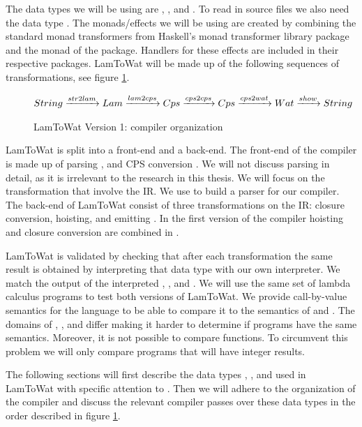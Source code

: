 The data types we will be using are , , and . To read in source files we also need the data type . The monads/effects we will be using are created by combining the standard monad transformers from Haskell's monad transformer library package  and the  monad of the  package. Handlers for these effects are included in their respective packages. LamToWat will be made up of the following sequences of transformations, see figure \ref{fig:lam2watv1org}.

\begin{figure}
\begin{gather*}
  String \xrightarrow{str2lam} Lam \xrightarrow{lam2cps} Cps \xrightarrow{cps2cps} Cps \xrightarrow{cps2wat} Wat \xrightarrow{show} String
\end{gather*}
\caption{LamToWat Version 1: compiler organization}
\label{fig:lam2watv1org}
\end{figure}

LamToWat is split into a front-end and a back-end. The front-end of the compiler is made up of parsing , and CPS conversion . We will not discuss  parsing in detail, as it is irrelevant to the research in this thesis. We will focus on the transformation that involve the IR. We use  to build a parser for our compiler. The back-end of LamToWat consist of three transformations on the IR: closure conversion, hoisting, and emitting . In the first version of the compiler hoisting and closure conversion are combined in .

LamToWat is validated by checking that after each transformation the same result is obtained by interpreting that data type with our own interpreter. We match the output of the interpreted , , and . We will use the same set of lambda calculus programs to test both versions of LamToWat. We provide call-by-value semantics for the  language to be able to compare it to the semantics of  and . The domains of , , and  differ making it harder to determine if programs have the same semantics. Moreover, it is not possible to compare functions. To circumvent this problem we will only compare programs that will have integer results.

The following sections will first describe the data types , , and  used in LamToWat with specific attention to . Then we will adhere to the organization of the compiler and discuss the relevant compiler passes over these data types in the order described in figure \ref{fig:lam2watv1org}.

